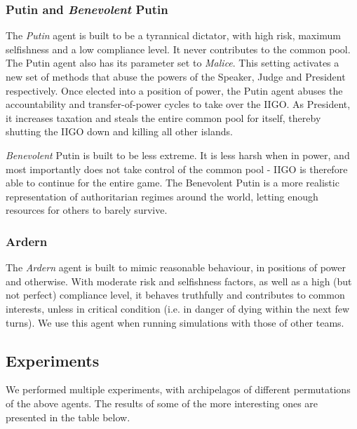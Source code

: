 \documentclass{article}
\begin{document}
\subsubsection{Putin and \textit{Benevolent} Putin}
The \textit{Putin} agent is built to be a tyrannical dictator, with high risk, maximum selfishness and a low compliance level. It never contributes to the common pool. The Putin agent also has its  parameter set to \textit{Malice}. This setting activates a new set of methods that abuse the powers of the Speaker, Judge and President respectively.  Once elected into a position of power, the Putin agent abuses the accountability and transfer-of-power cycles to take over the IIGO. As President, it increases taxation and steals the entire common pool for itself, thereby shutting the IIGO down and killing all other islands.

 \textit{Benevolent} Putin is built to be less extreme. It is less harsh when in power, and most importantly does not take control of the common pool - IIGO is therefore able to continue for the entire game. The Benevolent Putin is a more realistic representation of authoritarian regimes around the world, letting enough resources for others to barely survive.

\subsubsection{Ardern}
The \textit{Ardern} agent is built to mimic reasonable behaviour, in positions of power and otherwise. With moderate risk and selfishness factors, as well as a high (but not perfect) compliance level, it behaves truthfully and contributes to common interests, unless in critical condition (i.e. in danger of dying within the next few turns). We use this agent when running simulations with those of other teams.

\subsection{Experiments}

We performed multiple experiments, with archipelagos of different permutations of the above agents. The results of some of the more interesting ones are presented in the table below.

\end{document}

